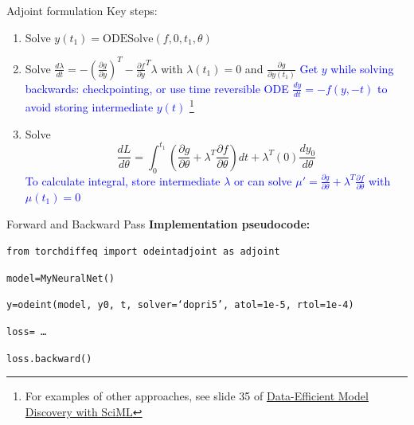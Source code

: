 \documentclass{beamer}
\begin{document}
\begin{frame}{Adjoint formulation}
Key steps:

\begin{enumerate}
    \item Solve $y(t_1) = \textrm{ODESolve}(f, 0, t_1, \theta)$
    
    \item Solve $\frac{d\lambda}{dt} = -\left(\frac{\partial g}{\partial y}\right)^T - \frac{\partial f}{\partial y}^T \lambda$ with $\lambda(t_1)=0$ and $\frac{\partial g}{\partial y(t_1)}$ \textcolor{blue}{Get $y$ while solving backwards: checkpointing, or use time reversible ODE $\frac{dy}{dt} = -f(y, -t)$ to avoid storing intermediate $y(t)$ 
    \footnote{For examples of other approaches, see slide 35 of \href{https://elliit.se/wp-content/uploads/2022/06/ELLIIT_FP2022_Lund_Chris_Rackauckas.pdf}{Data-Efficient Model Discovery with SciML}}
    }
    
    \item Solve $$\frac{dL}{d\theta} = \int_{0}^{t_1} \left(\frac{\partial g}{\partial \theta} + \lambda^T \frac{\partial f}{\partial \theta}\right)dt + \lambda^T(0) \frac{dy_0}{d\theta}$$ \textcolor{blue}{To calculate integral, store intermediate $\lambda$ or can solve $\mu' = \frac{\partial g}{\partial \theta} + \lambda^T \frac{\partial f}{\partial \theta}$ with $\mu(t_1)=0$}
\end{enumerate}

\end{frame}

\begin{frame}{Forward and Backward Pass}
    \textbf{Implementation pseudocode:} 
    
    \texttt{from torchdiffeq import odeint\textunderscore adjoint as adjoint}

    \texttt{model=MyNeuralNet()}

    \texttt{y=odeint(model, y0, t, solver=`dopri5', atol=1e-5, rtol=1e-4)}

    \texttt{loss= \ldots}

    \texttt{loss.backward()}
\end{frame}
\end{document}
